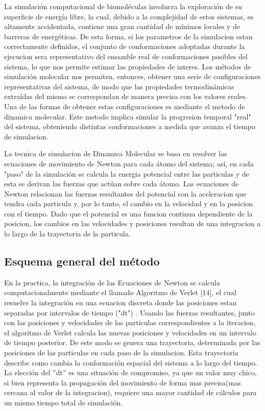 \documentclass[a4paper,10pt]{report}
\begin{document}
La simulación computacional de biomoléculas involucra la exploración de su superficie de energía libre, la cual, debido a la complejidad de estos sistemas, es altamente accidentada, contiene una gran cantidad de mínimos locales y de barreras de energéticas. 
De esta forma, si los parametros de la simulacion estan correctamente definidos, el conjunto de conformaciones adoptadas durante la ejecucion sera representativo del ensamble real de conformaciones posibles del sistema, lo que nos permite estimar las propiedades de interes.
Los métodos de simulación molecular nos permiten, entonces, obtener una serie de configuraciones representativas del sistema, de modo que las propiedades termodinámicas extraídas del mismo se correspondan de manera precisa con los valores reales.
Una de las formas de obtener estas configuraciones es mediante el metodo de dinamica molecular. Este metodo implica simular la progresion temporal "real" del sistema, obteniendo distintas conformaciones a medida que avanza el tiempo de simulacion.

La tecnica de simulacion de Dinamica Molecular se basa en resolver las ecuaciones de movimiento de Newton para cada átomo del sistema; así, en cada "paso" de la simulación se calcula la energia potencial entre las particulas y de esta se derivan las fuerzas que actúan sobre cada átomo. 
Las ecuaciones de Newton relacionan las fuerzas resultantes del potencial con la aceleracion que tendra cada particula y, por lo tanto, el cambio en la velocidad y en la posicion con el tiempo. 
Dado que el potencial es una funcion continua dependiente de la posicion, los cambios en las velocidades y posiciones resultan de una integracion a lo largo de la trayectoria de la particula.


\subsection{Esquema general del método}

En la practica, la integración de las Ecuaciones de Newton se calcula computacionalmente mediante el llamado Algoritmo de Verlet [14], el cual resuelve la integración en una ecuacion discreta donde las posiciones estan separadas por intervalos de tiempo ("dt") . 
Usando las fuerzas resultantes, junto con las posiciones y velocidades de las particulas correspondientes a la iteracion, el algoritmo de Verlet calcula las nuevas posiciones y velocidades en un intervalo de tiempo posterior. De este modo se genera una trayectoria, determinada por las posiciones de las particulas en cada paso de la simulacion. Esta trayectoria describe como cambia la conformación espacial del sistema a lo largo del tiempo. 
La elección del ''dt'' es una situación de compromiso, ya que un valor muy chico, si bien representa la propagación del movimiento de forma mas precisa(mas cercana al valor de la integracion), requiere una mayor cantidad de cálculos para un mismo tiempo total de simulación. 
\end{document}
